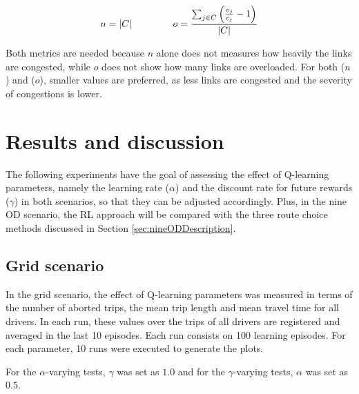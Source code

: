 \documentclass{RITA}
\newcommand{\linkCap}{\ensuremath{c_j}}		%
\newcommand{\veh}{\ensuremath{v}}		%
\newcommand{\congRoads}{\ensuremath{C}}		%
\newcommand{\numCong}{\ensuremath{n}}		%
\newcommand{\overLoadFactor}{\ensuremath{o}}	%
\begin{document}
\begin{equation}
\label{eq:balanceMetrics}
\numCong = |\congRoads| \hspace{1.5cm}  \overLoadFactor = \frac{ \sum_{\substack{j \in \congRoads}} \left(\frac{\veh_j}{\linkCap} -1 \right)}{|C|}
\end{equation}

Both metrics are needed because $n$ alone does not measures how heavily the links are congested, while $o$ does not show how many links are overloaded. For both ($n$) and ($o$), smaller values are preferred, as less links are congested and the severity of congestions is lower.

\section{Results and discussion}
\label{sec:results}

The following experiments have the goal of assessing the effect of Q-learning parameters, namely the learning rate ($\alpha$) and the discount rate for future rewards ($\gamma$) in both scenarios, so that they can be adjusted accordingly. Plus, in the nine OD scenario, the RL approach will be compared with the three route choice methods discussed in Section \ref{sec:nineODDescription}.


\subsection{Grid scenario}


In the grid scenario, the effect of Q-learning parameters was measured in terms of the number of aborted trips, the mean trip length and mean travel time for all drivers. In each run, these values over the trips of all drivers are registered and averaged in the last 10 episodes. Each run consists on 100 learning episodes. For each parameter, 10 runs were executed to generate the plots.

For the $\alpha$-varying tests, $\gamma$ was set as $1.0$ and for the $\gamma$-varying tests, $\alpha$ was set as $0.5$.
\end{document}
